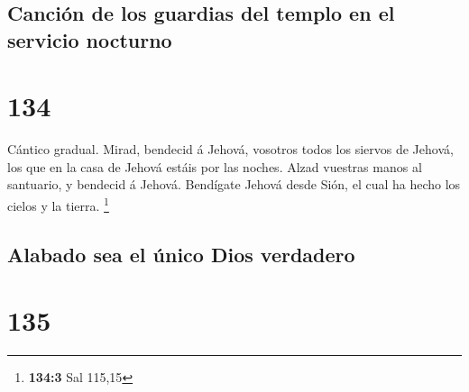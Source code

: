 \hypertarget{canciuxf3n-de-los-guardias-del-templo-en-el-servicio-nocturno}{%
\subsection{Canción de los guardias del templo en el servicio
nocturno}\label{canciuxf3n-de-los-guardias-del-templo-en-el-servicio-nocturno}}

\hypertarget{section-133}{%
\section{134}\label{section-133}}

 Cántico gradual. Mirad, bendecid á Jehová, vosotros todos
los siervos de Jehová, los que en la casa de Jehová estáis por las
noches.  Alzad vuestras manos al santuario, y bendecid á
Jehová.  Bendígate Jehová desde Sión, el cual ha hecho los
cielos y la tierra. \footnote{\textbf{134:3} Sal 115,15}

\hypertarget{alabado-sea-el-uxfanico-dios-verdadero}{%
\subsection{Alabado sea el único Dios
verdadero}\label{alabado-sea-el-uxfanico-dios-verdadero}}

\hypertarget{section-134}{%
\section{135}\label{section-134}}

